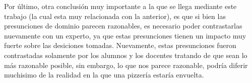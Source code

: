 \documentclass[a4paper,10pt]{article}
\begin{document}
\medskip

Por \'ultimo, otra conclusi\'on muy importante a la que se llega mediante este trabajo (la cual esta muy relacionada con la anterior), es que 
si bien las presunciones de dominio parecen razonables, es necesario poder contrastarlas nuevamente con un experto, ya que estas presunciones
tienen un impacto muy fuerte sobre las desiciones tomadas. Nuevamente, estas presunciones fueron contrastadas solamente por los alumnos y los docentes
tratando de que sean lo m\'as razonable posible, sin embargo, lo que nos parece razonable, podr\'ia diferir muchisimo de la realidad en la que 
una pizzer\'ia estar\'ia envuelta.
\end{document}
